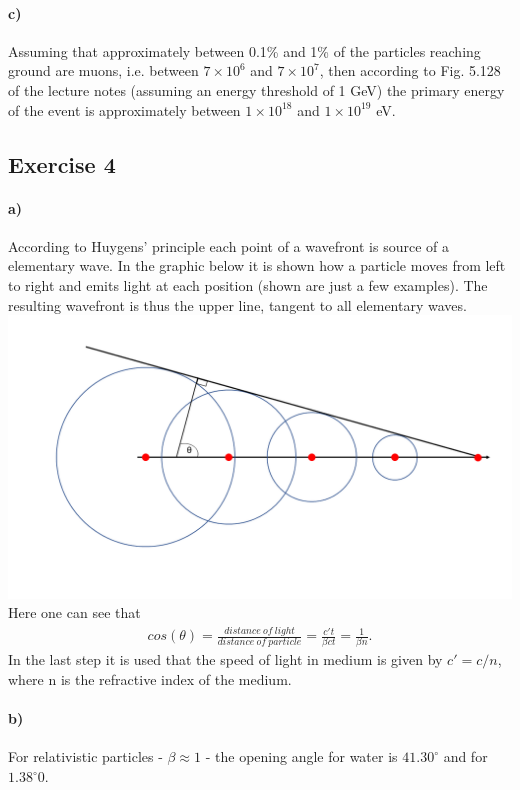 \documentclass{article}
\begin{document}
\paragraph{c)}
Assuming that approximately between 0.1\% and 1\% of the particles reaching ground are muons, i.e. between $7\times 10^6$ and $7\times 10^7$, then according to Fig. 5.128 of the lecture notes (assuming an energy threshold of 1 GeV) the primary energy of the event is approximately between $1\times 10^{18}$ and $1\times 10^{19}$ eV.

\subsection*{Exercise 4}
\paragraph{a)}
According to Huygens' principle each point of a wavefront is source of a elementary wave. 
In the graphic below it is shown how a particle moves from left to right and emits light at each position (shown are just a few examples). 
The resulting wavefront is thus the upper line, tangent to all elementary waves. \\
\includegraphics[width=\textwidth]{exercise4.png}\\
Here one can see that 
\begin{align*}
cos(\theta) = \frac{distance\ of\ light}{distance\ of\ particle} = \frac{c't}{\beta c t} = \frac{1}{\beta n}.
\end{align*}
In the last step it is used that the speed of light in medium is given by $c' = c / n$, where n is the refractive index of the medium.

\paragraph{b)}
For relativistic particles - $\beta \approx 1$ - the opening angle for water is $41.30^\circ$ and for $1.38^\circ0$.
\end{document}
